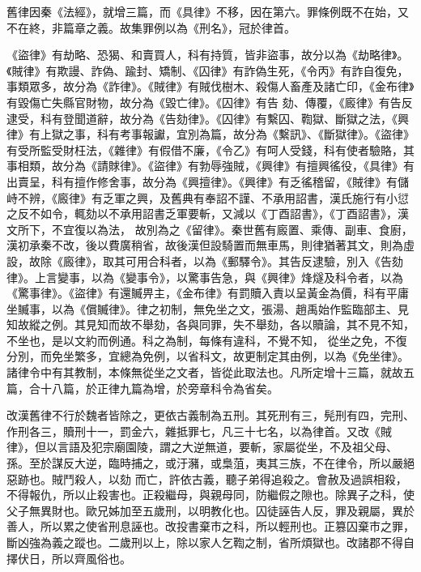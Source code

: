 \begin{pinyinscope}
 舊律因秦《法經》，就增三篇，而《具律》不移，因在第六。罪條例既不在始，又不在終，非篇章之義。故集罪例以為《刑名》，冠於律首。



 《盜律》有劫略、恐猲、和賣買人，科有持質，皆非盜事，故分以為《劫略律》。《賊律》有欺謾、詐偽、踰封、矯制、《囚律》有詐偽生死，《令丙》有詐自復免，事類眾多，故分為《詐律》。《賊律》有賊伐樹木、殺傷人畜產及諸亡印，《金布律》有毀傷亡失縣官財物，故分為《毀亡律》。《囚律》有告
 劾、傳覆，《廄律》有告反逮受，科有登聞道辭，故分為《告劾律》。《囚律》有繫囚、鞫獄、斷獄之法，《興律》有上獄之事，科有考事報讞，宜別為篇，故分為《繫訊》、《斷獄律》。《盜律》有受所監受財枉法，《雜律》有假借不廉，《令乙》有呵人受錢，科有使者驗賂，其事相類，故分為《請賕律》。《盜律》有勃辱強賊，《興律》有擅興徭役，《具律》有出賣呈，科有擅作修舍事，故分為《興擅律》。《興律》有乏徭稽留，《賊律》有儲峙不辨，《廄律》有乏軍之興，及舊典有奉詔不謹、不承用詔書，漢氏施行有小愆之反不如令，輒劾以不承用詔書乏軍要斬，又減以《丁酉詔書》，《丁酉詔書》，漢文所下，不宜復以為法，
 故別為之《留律》。秦世舊有廄置、乘傳、副車、食廚，漢初承秦不改，後以費廣稍省，故後漢但設騎置而無車馬，則律猶著其文，則為虛設，故除《廄律》，取其可用合科者，以為《郵驛令》。其告反逮驗，別入《告劾律》。上言變事，以為《變事令》，以驚事告急，與《興律》烽燧及科令者，以為《驚事律》。《盜律》有還贓畀主，《金布律》有罰贖入責以呈黃金為價，科有平庸坐贓事，以為《償贓律》。律之初制，無免坐之文，張湯、趙禹始作監臨部主、見知故縱之例。其見知而故不舉劾，各與同罪，失不舉劾，各以贖論，其不見不知，不坐也，是以文約而例通。科之為制，每條有違科，不覺不知，
 從坐之免，不復分別，而免坐繁多，宜總為免例，以省科文，故更制定其由例，以為《免坐律》。諸律令中有其教制，本條無從坐之文者，皆從此取法也。凡所定增十三篇，就故五篇，合十八篇，於正律九篇為增，於旁章科令為省矣。



 改漢舊律不行於魏者皆除之，更依古義制為五刑。其死刑有三，髡刑有四，完刑、作刑各三，贖刑十一，罰金六，雜抵罪七，凡三十七名，以為律首。又改《賊律》，但以言語及犯宗廟園陵，謂之大逆無道，要斬，家屬從坐，不及祖父母、孫。至於謀反大逆，臨時捕之，或汙瀦，或梟菹，夷其三族，不在律令，所以嚴絕惡跡也。賊鬥殺人，以劾
 而亡，許依古義，聽子弟得追殺之。會赦及過誤相殺，不得報仇，所以止殺害也。正殺繼母，與親母同，防繼假之隙也。除異子之科，使父子無異財也。歐兄姊加至五歲刑，以明教化也。囚徒誣告人反，罪及親屬，異於善人，所以累之使省刑息誣也。改投書棄市之科，所以輕刑也。正篡囚棄市之罪，斷凶強為義之蹤也。二歲刑以上，除以家人乞鞫之制，省所煩獄也。改諸郡不得自擇伏日，所以齊風俗也。




\end{pinyinscope}
